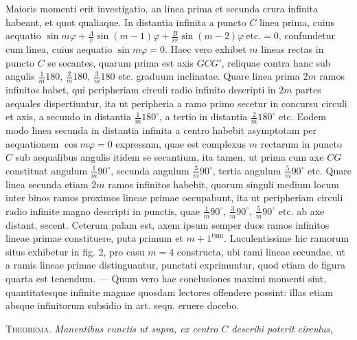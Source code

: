 Maioris momenti erit investigatio, an linea prima et secunda crura infinita habeant, et quot qualiaque. In distantia infinita a puncto $C$ linea prima, cuius aequatio $\sin m\varphi+\frac{A}{r}\sin(m-1)\varphi+\frac{B}{rr}\sin(m-2)\varphi\ \text{etc.}=0$, confundetur cum linea, cuius aequatio $\sin m\varphi=0$. Haec vero exhibet $m$ lineas rectas in puncto $C$ se secantes, quarum prima est axis $GCG'$, reliquae contra hanc sub angulis $\frac{1}{m}180$, $\frac{2}{m}180$, $\frac{3}{m}180$ etc. graduum inclinatae. Quare linea prima $2m$ ramos infinitos habet, qui peripheriam circuli radio infinito descripti in $2m$ partes aequales dispertiuntur, ita ut peripheria a ramo primo secetur in concursu circuli et axis, a secundo in distantia $\frac{1}{m}180^{\circ}$, a tertio in distantia $\frac{2}{m}180^{\circ}$ etc. Eodem modo linea secunda in distantia infinita a centro habebit asymptotam per aequationem $\cos m\varphi=0$ expressam, quae est complexus $m$ rectarum in puncto $C$ sub aequalibus angulis itidem se secantium, ita tamen, ut prima cum axe $CG$ constituat angulum $\frac{1}{m}90^{\circ}$, secunda angulum $\frac{3}{m}90^{\circ}$, tertia angulum $\frac{5}{m}90^{\circ}$ etc. Quare linea secunda etiam $2m$ ramos infinitos habebit, quorum singuli medium locum inter binos ramos proximos lineae primae occupabunt, ita ut peripheriam circuli radio infinite magno descripti in punctis, quae $\frac{1}{m}90^{\circ}$, $\frac{3}{m}90^{\circ}$, $\frac{5}{m}90^{\circ}$ etc. ab axe distant, secent. Ceterum palam est, axem ipsum semper duos ramos infinitos lineae primae constituere, puta primum et $m+1^{\mathrm{tum}}$. Luculentissime hic ramorum situs exhibetur in fig. 2, pro casu $m=4$ constructa, ubi rami lineae secundae, ut a ramis lineae primae distinguantur, punctati exprimuntur, quod etiam de figura quarta est tenendum. --- Quum vero hae conclusiones maximi momenti sint, quantitatesque infinite magnae quosdam lectores offendere possint: illas etiam absque infinitorum subsidio in art. sequ. eruere docebo.

\textsc{Theorema.} \textit{Manentibus cunctis ut supra, ex centro $C$ describi poterit circulus,}
